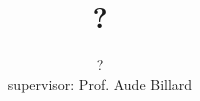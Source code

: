 \documentclass[a4paper,12pt]{article}
\title{?}
\author[]{?\\supervisor: Prof. Aude Billard}
\affil[]{École Polytechnique Fédérale de Lausanne (EPFL), LASA}
\begin{document}
\maketitle

\begin{abstract}

\end{abstract}
\end{document}
